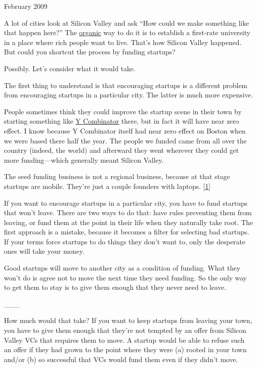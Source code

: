 February 2009

A lot of cities look at Silicon Valley and ask ``How could we make
something like that happen here?'' The
\href{siliconvalley.html}{organic} way to do it is to establish a
first-rate university in a place where rich people want to live. That's
how Silicon Valley happened. But could you shortcut the process by
funding startups?

Possibly. Let's consider what it would take.

The first thing to understand is that encouraging startups is a
different problem from encouraging startups in a particular city. The
latter is much more expensive.

People sometimes think they could improve the startup scene in their
town by starting something like \href{http://ycombinator.com}{Y
Combinator} there, but in fact it will have near zero effect. I know
because Y Combinator itself had near zero effect on Boston when we were
based there half the year. The people we funded came from all over the
country (indeed, the world) and afterward they went wherever they could
get more funding---which generally meant Silicon Valley.

The seed funding business is not a regional business, because at that
stage startups are mobile. They're just a couple founders with laptops.
{[}\hyperref[f1n]{1}{]}

If you want to encourage startups in a particular city, you have to fund
startups that won't leave. There are two ways to do that: have rules
preventing them from leaving, or fund them at the point in their life
when they naturally take root. The first approach is a mistake, because
it becomes a filter for selecting bad startups. If your terms force
startups to do things they don't want to, only the desperate ones will
take your money.

Good startups will move to another city as a condition of funding. What
they won't do is agree not to move the next time they need funding. So
the only way to get them to stay is to give them enough that they never
need to leave.

\_\_\_

How much would that take? If you want to keep startups from leaving your
town, you have to give them enough that they're not tempted by an offer
from Silicon Valley VCs that requires them to move. A startup would be
able to refuse such an offer if they had grown to the point where they
were (a) rooted in your town and/or (b) so successful that VCs would
fund them even if they didn't move.

